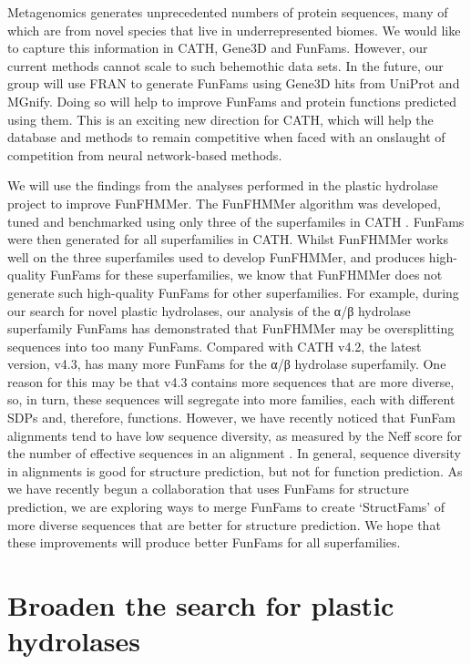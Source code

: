 Metagenomics generates unprecedented numbers of protein sequences, many of which are from novel species that live in underrepresented biomes. We would like to capture this information in CATH, Gene3D and FunFams. However, our current methods cannot scale to such behemothic data sets. In the future, our group will use FRAN to generate FunFams using Gene3D hits from UniProt and MGnify. Doing so will help to improve FunFams and protein functions predicted using them. This is an exciting new direction for CATH, which will help the database and methods to remain competitive when faced with an onslaught of competition from neural network-based methods.

We will use the findings from the analyses performed in the plastic hydrolase project to improve FunFHMMer.
The FunFHMMer algorithm was developed, tuned and benchmarked using only three of the superfamiles in CATH \cite{Das2015b}.
FunFams were then generated for all superfamilies in CATH.
Whilst FunFHMMer works well on the three superfamiles used to develop FunFHMMer, and produces high-quality FunFams for these superfamilies, we know that FunFHMMer does not generate such high-quality FunFams for other superfamilies.
For example, during our search for novel plastic hydrolases, our analysis of the α/β hydrolase superfamily FunFams has demonstrated that FunFHMMer may be oversplitting sequences into too many FunFams.
Compared with CATH v4.2, the latest version, v4.3, has many more FunFams for the α/β hydrolase superfamily.
One reason for this may be that v4.3 contains more sequences that are more diverse, so, in turn, these sequences will segregate into more families, each with different SDPs and, therefore, functions.
However, we have recently noticed that FunFam alignments tend to have low sequence diversity, as measured by the Neff score for the number of effective sequences in an alignment \cite{Altschul1997,Peng2010}.
In general, sequence diversity in alignments is good for structure prediction, but not for function prediction.
As we have recently begun a collaboration that uses FunFams for structure prediction, we are exploring ways to merge FunFams to create `StructFams' of more diverse sequences that are better for structure prediction.
We hope that these improvements will produce better FunFams for all superfamilies.

\section{Broaden the search for plastic hydrolases}

